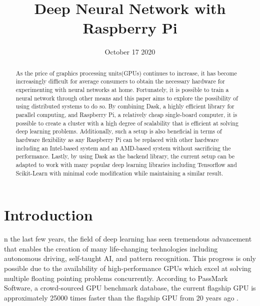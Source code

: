 \documentclass[conference]{IEEEtran}
\begin{document}
    \title{Deep Neural Network with Raspberry Pi}
    \author{
        \and
    }
    \date{October 17 2020}
    \maketitle

    \begin{abstract}
        As the price of graphics processing units(GPUs) continues to increase, it has become increasingly difficult for average consumers to obtain the necessary hardware for experimenting with neural networks at home. Fortunately, it is possible to train a neural network through other means and this paper aims to explore the possibility of using distributed systems to do so. By combining Dask, a highly efficient library for parallel computing, and Raspberry Pi, a relatively cheap single-board computer, it is possible to create a cluster with a high degree of scalability that is efficient at solving deep learning problems. Additionally, such a setup is also beneficial in terms of hardware flexibility as any Raspberry Pi can be replaced with other hardware including an Intel-based system and an AMD-based system without sacrificing the performance. Lastly, by using Dask as the backend library, the current setup can be adapted to work with many popular deep learning libraries including Tensorflow and Scikit-Learn with minimal code modification while maintaining a similar result.
        \end{abstract}

    \section{Introduction}
        n the last few years, the field of deep learning has seen tremendous advancement that enables the creation of many life-changing technologies including autonomous driving, self-taught AI, and pattern recognition. This progress is only possible due to the availability of high-performance GPUs which excel at solving multiple floating pointing problems concurrently.
        According to PassMark Software, a crowd-sourced GPU benchmark database, the current flagship GPU is approximately 25000 times faster than the flagship GPU from 20 years ago \cite{passmark_software}. 
\end{document}
